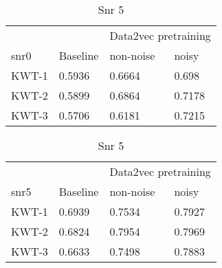 \begin{table}[ht]
    \begin{subtable}[ht]{0.45\textwidth}
        \centering
        \begin{tabular}{@{}llll@{}}
        \toprule
        & & \multicolumn{2}{c}{Data2vec pretraining} \\ \cline{3-4}
        snr0    & Baseline & non-noise & noisy \\ \midrule
        KWT-1    & 0.5936  & 0.6664 & 0.698 \\
        KWT-2    & 0.5899  & 0.6864 & 0.7178 \\
        KWT-3    & 0.5706  & 0.6181 & 0.7215 \\
        \bottomrule
        \end{tabular}
        \caption{Snr 0}
    \end{subtable}
    \hfill
    \begin{subtable}[ht]{0.45\textwidth}
        \centering
        \begin{tabular}{@{}llll@{}}
        \toprule
        & & \multicolumn{2}{c}{Data2vec pretraining} \\ \cline{3-4}
        snr5    & Baseline & non-noise & noisy \\ \midrule
        KWT-1    & 0.6939  & 0.7534 & 0.7927 \\
        KWT-2    & 0.6824  & 0.7954 & 0.7969 \\
        KWT-3    & 0.6633  & 0.7498 & 0.7883 \\
        \bottomrule
        \end{tabular}
        \caption{Snr 5}
    \end{subtable}


    \bigskip



\end{table}
